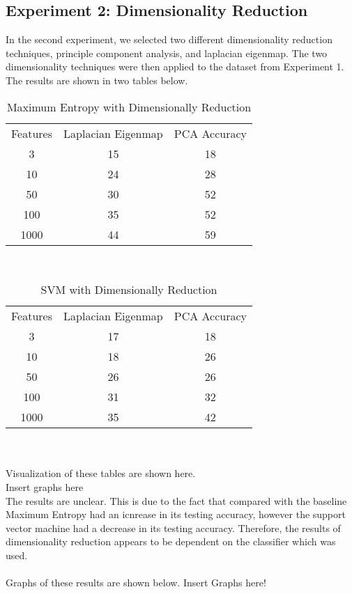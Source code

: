 \subsection{Experiment 2: Dimensionality Reduction}
In the second experiment, we selected two different dimensionality reduction techniques, principle component analysis, and laplacian eigenmap.
The two dimensionality techniques were then applied to the dataset from Experiment 1.  The results are shown in two tables below.
\\
\begin{table}[h]
\caption{Maximum Entropy with Dimensionally Reduction}
\centering
\begin{tabular}{c c c}
Features & Laplacian Eigenmap & PCA Accuracy \\
3 & 15 & 18 \\
10 & 24 & 28 \\
50 & 30 & 52 \\
100 & 35 & 52 \\
1000 & 44 & 59 \\
\end{tabular}
\end{table}
\\
\begin{table}[h]
\caption{SVM with Dimensionally Reduction}
\centering
\begin{tabular}{c c c}
Features & Laplacian Eigenmap & PCA Accuracy \\
3 & 17 & 18 \\
10 & 18 & 26 \\
50 & 26 & 26 \\
100 & 31 & 32 \\
1000 & 35 & 42 \\
\end{tabular}
\end{table}
\\
\\ Visualization of these tables are shown here.
\\ Insert graphs here
\\
The results are unclear.  This is due to the fact that compared with the baseline Maximum Entropy had an icnrease in its testing accuracy, however
the support vector machine had a decrease in its testing accuracy.  Therefore, the results of dimensionality reduction appears to be dependent
on the classifier which was used.
\\
\\ Graphs of these results are shown below.
Insert Graphs here!
\\
